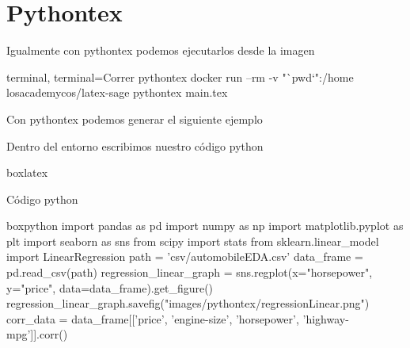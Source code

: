 {	\section{Pythontex}
	Igualmente con pythontex podemos ejecutarlos desde la imagen
	\begin{tcblisting}{terminal, terminal={Correr pythontex}}
		docker run --rm -v "`pwd`":/home losacademycos/latex-sage pythontex main.tex
	\end{tcblisting}
	Con pythontex podemos generar el siguiente ejemplo
	\begin{center}
	\end{center}
	Dentro del entorno escribimos nuestro código python 
	\begin{tcblisting}{boxlatex}
		\begin{pycode}
		Código python
		\end{pycode}
	\end{tcblisting}
	\begin{figure}[H]
		\centering
	\end{figure}
	\begin{tcblisting}{boxpython}
		import pandas as pd
		import numpy as np
		import matplotlib.pyplot as plt
		import seaborn as sns
		from scipy import stats
		from sklearn.linear_model import LinearRegression
		path = 'csv/automobileEDA.csv'
		data_frame = pd.read_csv(path)
		regression_linear_graph = sns.regplot(x="horsepower", y="price", data=data_frame).get_figure()
		regression_linear_graph.savefig("images/pythontex/regressionLinear.png")
		corr_data = data_frame[['price', 'engine-size', 'horsepower', 'highway-mpg']].corr()
	\end{tcblisting}
}